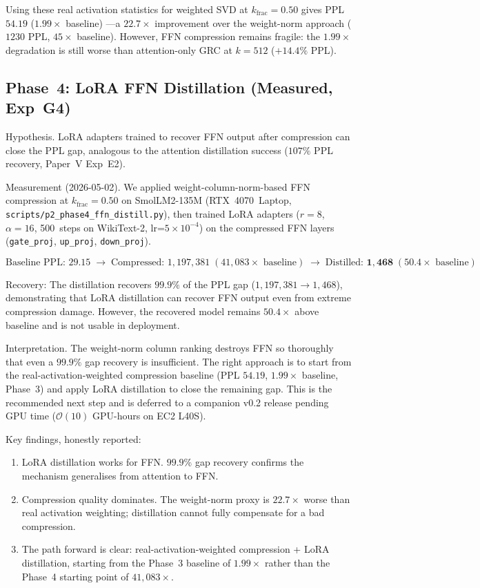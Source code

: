 \documentclass[11pt]{article}
\begin{document}
Using these real activation statistics for weighted SVD at
$k_\text{frac}{=}0.50$ gives PPL $\mathbf{54.19}$
($\mathbf{1.99{\times}}$ baseline) ---a $\mathbf{22.7{\times}}$ improvement
over the weight-norm approach ($1230$ PPL, $45{\times}$ baseline).  However,
FFN compression remains fragile: the $1.99{\times}$ degradation is still
worse than attention-only GRC at $k{=}512$ ($+14.4\%$ PPL).

\subsection{Phase~4: LoRA FFN Distillation (Measured, Exp~G4)}

Hypothesis.  LoRA adapters trained to recover FFN output after
compression can close the PPL gap, analogous to the attention
distillation success ($107\%$ PPL recovery, Paper~V Exp~E2).

Measurement (2026-05-02).  We applied weight-column-norm-based
FFN compression at $k_\text{frac}{=}0.50$ on SmolLM2-135M (RTX~4070~Laptop,
\texttt{scripts/p2\_phase4\_ffn\_distill.py}), then trained LoRA adapters
($r{=}8$, $\alpha{=}16$, 500~steps on WikiText-2, lr=$5{\times}10^{-4}$)
on the compressed FFN layers (\texttt{gate\_proj}, \texttt{up\_proj},
\texttt{down\_proj}).

\[
\text{Baseline PPL: } 29.15 \;\rightarrow\;
\text{Compressed: } 1{,}197{,}381 \; (41{,}083{\times}\text{ baseline}) \;\rightarrow\;
\text{Distilled: } \mathbf{1{,}468} \; (\mathbf{50.4{\times}}\text{ baseline})
\]

Recovery:  The distillation recovers $\mathbf{99.9\%}$ of the
PPL gap ($1{,}197{,}381\to 1{,}468$), demonstrating that LoRA distillation
can recover FFN output even from extreme compression damage.
However, the recovered model remains $\mathbf{50.4{\times}}$ above baseline
and is not usable in deployment.

Interpretation.  The weight-norm column ranking destroys FFN
so thoroughly that even a $99.9\%$ gap recovery is insufficient.
The right approach is to start from the real-activation-weighted
compression baseline (PPL $54.19$, $1.99{\times}$ baseline, Phase~3)
and apply LoRA distillation to close the remaining gap.  This is
the recommended next step and is deferred to a companion v0.2 release
pending GPU time ($\mathcal{O}(10)$ GPU-hours on EC2 L40S).

Key findings, honestly reported:
\begin{enumerate}
\item LoRA distillation works for FFN.  $99.9\%$ gap recovery
      confirms the mechanism generalises from attention to FFN.
\item Compression quality dominates.  The weight-norm proxy
      is $22.7{\times}$ worse than real activation weighting; distillation
      cannot fully compensate for a bad compression.
\item The path forward is clear: real-activation-weighted
      compression + LoRA distillation, starting from the Phase~3
      baseline of $1.99{\times}$ rather than the Phase~4 starting
      point of $41{,}083{\times}$.
\end{enumerate}
\end{document}
